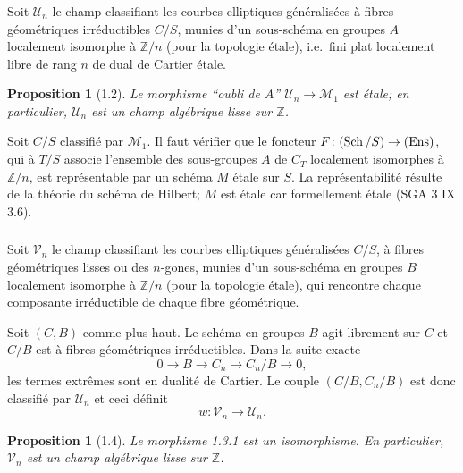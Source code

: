\documentclass[11pt,a4paper]{amsart}
\theoremstyle{plain}
\newtheorem{proposition}[theorem]{Proposition}
\theoremstyle{definition}
\DeclareMathOperator{\Sch}{Sch}
\newcommand{\CU}{\mathcal{U}}
\newcommand{\CV}{\mathcal{V}}
\newcommand{\mll}{\mathcal{M}}
\newcommand{\ZZ}{\mathbb{Z}}
\newcommand{\ens}{\textup{Ens}}
\begin{document}
\subsubsection{}
Soit $\CU_n$ le champ classifiant les courbes elliptiques g\'en\'eralis\'ees \`a fibres g\'eom\'etriques irr\'eductibles $C/S$, munies d'un sous-sch\'ema en groupes $A$ localement isomorphe \`a $\ZZ/n$ (pour la topologie \'etale), i.e.\ fini plat localement libre de rang $n$ de dual de Cartier \'etale.

\begin{proposition}[1.2]
Le morphisme ``oubli de $A$'' $\CU_n \to \mll_1$ est \'etale; en particulier, $\CU_n$ est un champ alg\'ebrique lisse sur $\ZZ$.
\end{proposition}

Soit $C/S$ classifi\'e par $\mll_1$. Il faut v\'erifier que le foncteur $F \colon (\Sch/S) \to (\ens)$, qui \`a $T/S$ associe l'ensemble des sous-groupes $A$ de $C_T$ localement isomorphes \`a $\ZZ/n$, est repr\'esentable par un sch\'ema $M$ \'etale sur $S$. La repr\'esentabilit\'e r\'esulte de la th\'eorie du sch\'ema de Hilbert; $M$ est \'etale car formellement \'etale (SGA 3 IX 3.6).

\subsubsection{}
Soit $\CV_n$ le champ classifiant les courbes elliptiques g\'en\'eralis\'ees $C/S$, \`a fibres g\'eom\'etriques lisses ou des $n$-gones, munies d'un sous-sch\'ema en groupes $B$ localement isomorphe \`a $\ZZ/n$ (pour la topologie \'etale), qui rencontre chaque composante irr\'eductible de chaque fibre g\'eom\'etrique.

Soit $(C,B)$ comme plus haut. Le sch\'ema en groupes $B$ agit librement sur $C$ et $C/B$ est \`a fibres g\'eom\'etriques irr\'eductibles. Dans la suite exacte
\[
0 \longrightarrow B \longrightarrow C_n \longrightarrow C_n/B \longrightarrow 0,
\]
les termes extr\^emes sont en dualit\'e de Cartier. Le couple $(C/B, C_n/B)$ est donc classifi\'e par $\CU_n$ et ceci d\'efinit
\begin{equation}\label{eq:1.3.1}
w \colon \CV_n \longrightarrow \CU_n.
\end{equation}

\begin{proposition}[1.4]
Le morphisme 1.3.1 est un isomorphisme. En particulier, $\CV_n$ est un champ alg\'ebrique lisse sur $\ZZ$.
\end{proposition}
\end{document}
